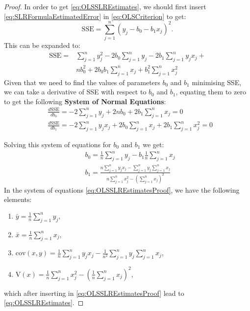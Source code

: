 \documentclass[
]{book}
\providecommand{\tightlist}{%
  \setlength{\itemsep}{0pt}\setlength{\parskip}{0pt}}
\theoremstyle{definition}
\theoremstyle{definition}
\theoremstyle{definition}
\theoremstyle{definition}
\theoremstyle{remark}
\begin{document}
\begin{proof}
In order to get \eqref{eq:OLSSLREstimates}, we should first insert \eqref{eq:SLRFormulaEstimatedError} in \eqref{eq:OLSCriterion} to get:
\begin{equation*}
    \mathrm{SSE} = \sum_{j=1}^n (y_j - {b}_0 - {b}_1 x_j)^2 .
\end{equation*}
This can be expanded to:
\begin{equation*}
    \begin{aligned}
        \mathrm{SSE} = & \sum_{j=1}^n y_j^2 - 2 b_0 \sum_{j=1}^n y_j - 2 b_1 \sum_{j=1}^n y_j x_j + \\
                       & n b_0^2 + 2 b_0 b_1 \sum_{j=1}^n x_j + b_1^2 \sum_{j=1}^n x_j^2
    \end{aligned}
\end{equation*}
Given that we need to find the values of parameters \(b_0\) and \(b_1\) minimising SSE, we can take a derivative of SSE with respect to \(b_0\) and \(b_1\), equating them to zero to get the following \textbf{System of Normal Equations}:
\begin{equation*}
    \begin{aligned}
        & \frac{d \mathrm{SSE}}{d b_0} = -2 \sum_{j=1}^n y_j + 2 n b_0 + 2 b_1 \sum_{j=1}^n x_j = 0 \\
        & \frac{d \mathrm{SSE}}{d b_1} = -2 \sum_{j=1}^n y_j x_j  + 2 b_0 \sum_{j=1}^n x_j + 2 b_1 \sum_{j=1}^n x_j^2 = 0
    \end{aligned}
\end{equation*}

Solving this system of equations for \(b_0\) and \(b_1\) we get:
\begin{equation}
    \begin{aligned}
        & b_0 = \frac{1}{n}\sum_{j=1}^n y_j - b_1 \frac{1}{n}\sum_{j=1}^n x_j \\
        & b_1 = \frac{n \sum_{j=1}^n y_j x_j - \sum_{j=1}^n y_j \sum_{j=1}^n x_j}{n \sum_{j=1}^n x_j^2 - \left(\sum_{j=1}^n x_j \right)^2}
    \end{aligned}
    \label{eq:OLSSLREstimatesProof}
\end{equation}
In the system of equations \eqref{eq:OLSSLREstimatesProof}, we have the following elements:

\begin{enumerate}
\def\labelenumi{\arabic{enumi}.}
\tightlist
\item
  \(\bar{y}=\frac{1}{n}\sum_{j=1}^n y_j\),
\item
  \(\bar{x}=\frac{1}{n}\sum_{j=1}^n x_j\),
\item
  \(\mathrm{cov}(x,y) = \frac{1}{n}\sum_{j=1}^n y_j x_j - \frac{1}{n^2}\sum_{j=1}^n y_j \sum_{j=1}^n x_j\),
\item
  \(\mathrm{V}(x) = \frac{1}{n}\sum_{j=1}^n x_j^2 - \left(\frac{1}{n} \sum_{j=1}^n x_j \right)^2\),
\end{enumerate}

which after inserting in \eqref{eq:OLSSLREstimatesProof} lead to \eqref{eq:OLSSLREstimates}.
\end{proof}
\end{document}
